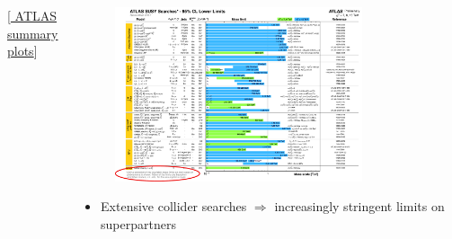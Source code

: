 \documentclass[10pt,aspectratio=169]{beamer}
\begin{document}
\begin{frame}
\begin{columns}[t]
\begin{column}{0.3\textwidth}
      \vspace{-25pt}
      \begin{center}
        { \tiny
          [\href{http://atlas.web.cern.ch/Atlas/GROUPS/PHYSICS/CombinedSummaryPlots/SUSY/}{%
              ATLAS summary plots}]
          }
      \end{center}
    \end{column}
    \begin{column}{0.7\textwidth}
      \vspace{-20pt}
      \begin{figure}
        \centering
        \includegraphics[width=0.8\textwidth]{ATLAS_SUSY_Summary}
      \end{figure}
      \vspace{-15pt}
      \begin{itemize}\itemsep1em
      \item Extensive collider searches $\Rightarrow$ increasingly
        stringent limits on superpartners
      \end{itemize}
    \end{column}
  \end{columns}
\end{frame}
\end{document}
